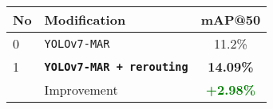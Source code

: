  \begin{tabular}{ l l c }
    \toprule[1.5pt]
    No & Modification                                      &mAP@50 \\
    \midrule
    0  & \texttt{YOLOv7-MAR}                           & 11.2\%\\
    1  & \texttt{\textbf{YOLOv7-MAR + rerouting}} & \textbf{14.09\%}\\
    \midrule
       & Improvement                                & \textbf{\textcolor{green}{+2.98\%}}\\
    \bottomrule[1.5pt]
  \end{tabular}